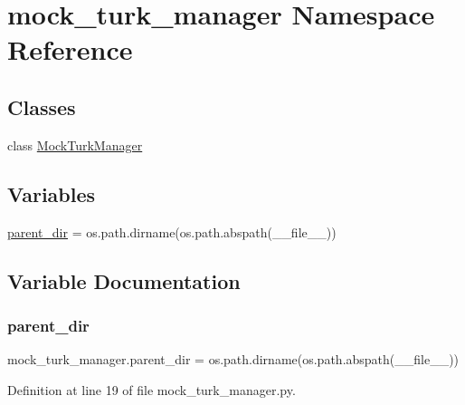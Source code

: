 \hypertarget{namespacemock__turk__manager}{}\section{mock\+\_\+turk\+\_\+manager Namespace Reference}
\label{namespacemock__turk__manager}
\subsection*{Classes}
\begin{DoxyCompactItemize}
\item 
class \hyperlink{classmock__turk__manager_1_1MockTurkManager}{Mock\+Turk\+Manager}
\end{DoxyCompactItemize}
\subsection*{Variables}
\begin{DoxyCompactItemize}
\item 
\hyperlink{namespacemock__turk__manager_a49a82dc4f9013a5e063ae280e3878438}{parent\+\_\+dir} = os.\+path.\+dirname(os.\+path.\+abspath(\+\_\+\+\_\+file\+\_\+\+\_\+))
\end{DoxyCompactItemize}


\subsection{Variable Documentation}
\mbox{\label{namespacemock__turk__manager_a49a82dc4f9013a5e063ae280e3878438}} 
\subsubsection{\texorpdfstring{parent\+\_\+dir}{parent\_dir}}
{\footnotesize\ttfamily mock\+\_\+turk\+\_\+manager.\+parent\+\_\+dir = os.\+path.\+dirname(os.\+path.\+abspath(\+\_\+\+\_\+file\+\_\+\+\_\+))}



Definition at line 19 of file mock\+\_\+turk\+\_\+manager.\+py.


